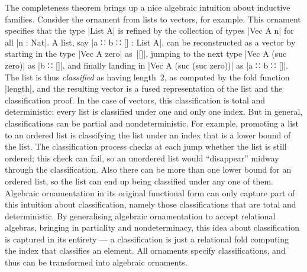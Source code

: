 The completeness theorem brings up a nice algebraic intuition about inductive families.
Consider the ornament from lists to vectors, for example.
This ornament specifies that the type |List A| is refined by the collection of types |Vec A n| for all |n : Nat|.
A list, say |a ∷ b ∷ [] : List A|, can be reconstructed as a vector by starting in the type |Vec A zero| as~|[]|, jumping to the next type |Vec A (suc zero)| as |b ∷ []|, and finally landing in |Vec A (suc (suc zero))| as |a ∷ b ∷ []|.
The list is thus \emph{classified} as having length~$2$, as computed by the fold function |length|, and the resulting vector is a fused representation of the list and the classification proof.
In the case of vectors, this classification is total and deterministic: every list is classified under one and only one index.
But in general, classifications can be partial and nondeterministic.
For example, promoting a list to an ordered list is classifying the list under an index that is a lower bound of the list.
The classification process checks at each jump whether the list is still ordered; this check can fail, so an unordered list would ``disappear'' midway through the classification.
Also there can be more than one lower bound for an ordered list, so the list can end up being classified under any one of them.
Algebraic ornamentation in its original functional form can only capture part of this intuition about classification, namely those classifications that are total and deterministic.
By generalising algebraic ornamentation to accept relational algebras, bringing in partiality and nondeterminacy, this idea about classification is captured in its entirety --- a classification is just a relational fold computing the index that classifies an element.
All ornaments specify classifications, and thus can be transformed into algebraic ornaments.

